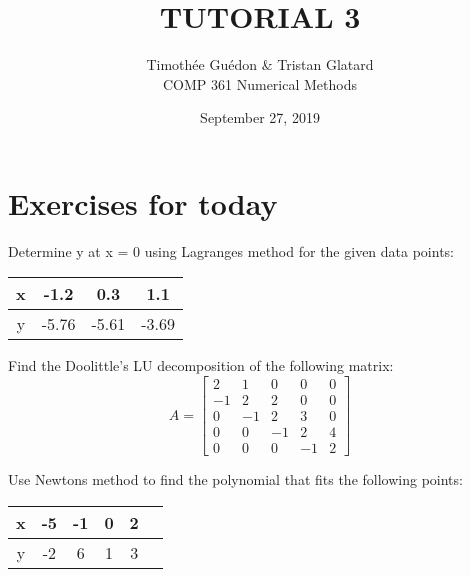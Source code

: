 \documentclass[12pt]{article}
\newenvironment{exercise}[2][Exercise]{\begin{trivlist}
\item[\hskip \labelsep {\bfseries #1}\hskip \labelsep {\bfseries #2.}]}{\end{trivlist}}
\begin{document}
\title{TUTORIAL 3}
\author{Timothée Guédon \& Tristan Glatard\\
COMP 361 Numerical Methods}
\date{September 27, 2019}
\maketitle

\section{Exercises for today}

\begin{exercise}{1}

  Determine y at x = 0 using Lagrange\textquotesingle s method for the given data points: \\
  \begin{table}[h]
  \centering
  \begin{tabular}{|c|c|c|c|}
    \hline
    x & -1.2 & 0.3 & 1.1 \\ \hline
    y & -5.76 & -5.61 & -3.69 \\ \hline
  \end{tabular}
  \end{table}

\end{exercise}

\begin{exercise}{2}

  Find the Doolittle's LU decomposition of the following matrix: \\

  $$A=\begin{bmatrix}
    2 & 1 & 0 & 0 & 0 \\
    -1 & 2 & 2 & 0 & 0 \\
    0 & -1 & 2 & 3 & 0 \\
    0 & 0 & -1 & 2 & 4 \\
    0 & 0 & 0 & -1 & 2
  \end{bmatrix}$$

\end{exercise}

\begin{exercise}{3} %
  Use Newton\textquotesingle s method to find the polynomial that fits the following points:\\
  \begin{table}[h]
    \centering
    \begin{tabular}{|c|c|c|c|c|c|}
      \hline
      x & -5 & -1 & 0 & 2 \\ \hline
      y & -2 & 6 & 1 & 3 \\ \hline
    \end{tabular}
  \end{table}
\end{exercise}
\end{document}
